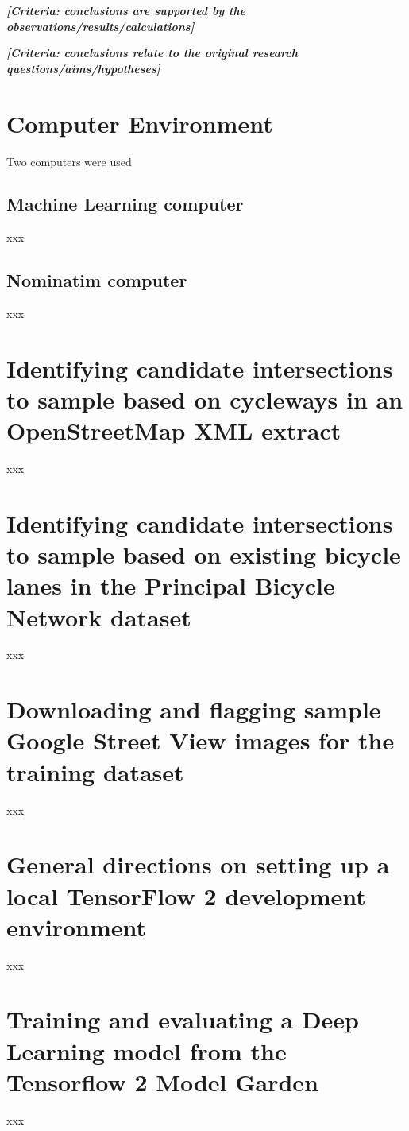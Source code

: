 \documentclass[11pt,twoside]{report}
\newcommand{\remark}[1]{{\bf \em [\marginpar{$\Leftarrow$}#1]}}
\begin{document}
\remark{Criteria: conclusions are supported by the observations/results/calculations}

\remark{Criteria: conclusions relate to the original research questions/aims/hypotheses}

\appendix
\chapter{Computer Environment}
\label{a:environment}

Two computers were used

\section{Machine Learning computer}
\label{a:computer}

xxx

\section{Nominatim computer}
\label{a:nominatim}

xxx

\chapter{Identifying candidate intersections to sample based on cycleways in an OpenStreetMap XML extract}
\label{a:sample_osm}

xxx

\chapter{Identifying candidate intersections to sample based on existing bicycle lanes in the Principal Bicycle Network dataset}
\label{a:sample_pbn}

xxx

\chapter{Downloading and flagging sample Google Street View images for the training dataset}
\label{a:download_gsv}

xxx

\chapter{General directions on setting up a local TensorFlow 2 development environment}
\label{a:setupenv}

xxx

\chapter{Training and evaluating a Deep Learning model from the Tensorflow 2 Model Garden}
\label{a:tensorflow_training}

xxx


\cleardoublepage


\end{document}
